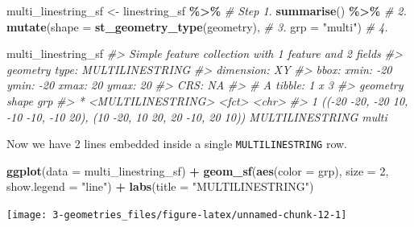 \documentclass[
]{report}
\newenvironment{Shaded}{\begin{snugshade}}{\end{snugshade}}
\newcommand{\CommentTok}[1]{\textcolor[rgb]{0.56,0.35,0.01}{\textit{#1}}}
\newcommand{\DataTypeTok}[1]{\textcolor[rgb]{0.13,0.29,0.53}{#1}}
\newcommand{\DecValTok}[1]{\textcolor[rgb]{0.00,0.00,0.81}{#1}}
\newcommand{\KeywordTok}[1]{\textcolor[rgb]{0.13,0.29,0.53}{\textbf{#1}}}
\newcommand{\NormalTok}[1]{#1}
\newcommand{\OperatorTok}[1]{\textcolor[rgb]{0.81,0.36,0.00}{\textbf{#1}}}
\newcommand{\StringTok}[1]{\textcolor[rgb]{0.31,0.60,0.02}{#1}}
\begin{document}
\begin{Shaded}
\begin{Highlighting}[]
\NormalTok{multi\_linestring\_sf \textless{}{-}}\StringTok{ }\NormalTok{linestring\_sf }\OperatorTok{\%\textgreater{}\%}\StringTok{     }\CommentTok{\# Step 1.}
\StringTok{  }\KeywordTok{summarise}\NormalTok{() }\OperatorTok{\%\textgreater{}\%}\StringTok{                            }\CommentTok{\# 2.}
\StringTok{  }\KeywordTok{mutate}\NormalTok{(}\DataTypeTok{shape =} \KeywordTok{st\_geometry\_type}\NormalTok{(geometry), }\CommentTok{\# 3.}
         \DataTypeTok{grp =} \StringTok{"multi"}\NormalTok{)                      }\CommentTok{\# 4.}

\NormalTok{multi\_linestring\_sf}
\CommentTok{\#\textgreater{} Simple feature collection with 1 feature and 2 fields}
\CommentTok{\#\textgreater{} geometry type:  MULTILINESTRING}
\CommentTok{\#\textgreater{} dimension:      XY}
\CommentTok{\#\textgreater{} bbox:           xmin: {-}20 ymin: {-}20 xmax: 20 ymax: 20}
\CommentTok{\#\textgreater{} CRS:            NA}
\CommentTok{\#\textgreater{} \# A tibble: 1 x 3}
\CommentTok{\#\textgreater{}                                                               geometry shape           grp  }
\CommentTok{\#\textgreater{} *                                                    \textless{}MULTILINESTRING\textgreater{} \textless{}fct\textgreater{}           \textless{}chr\textgreater{}}
\CommentTok{\#\textgreater{} 1 (({-}20 {-}20, {-}20 10, {-}10 {-}10, {-}10 20), (10 {-}20, 10 20, 20 {-}10, 20 10)) MULTILINESTRING multi}
\end{Highlighting}
\end{Shaded}

Now we have 2 lines embedded inside a single \texttt{MULTILINESTRING} row.

\begin{Shaded}
\begin{Highlighting}[]
\KeywordTok{ggplot}\NormalTok{(}\DataTypeTok{data =}\NormalTok{ multi\_linestring\_sf) }\OperatorTok{+}\StringTok{ }
\StringTok{  }\KeywordTok{geom\_sf}\NormalTok{(}\KeywordTok{aes}\NormalTok{(}\DataTypeTok{color =}\NormalTok{ grp), }\DataTypeTok{size =} \DecValTok{2}\NormalTok{, }\DataTypeTok{show.legend =} \StringTok{"line"}\NormalTok{) }\OperatorTok{+}
\StringTok{  }\KeywordTok{labs}\NormalTok{(}\DataTypeTok{title =} \StringTok{"MULTILINESTRING"}\NormalTok{)}
\end{Highlighting}
\end{Shaded}

\begin{center}\texttt{[image: 3-geometries\_files/figure-latex/unnamed-chunk-12-1]} \end{center}
\end{document}
